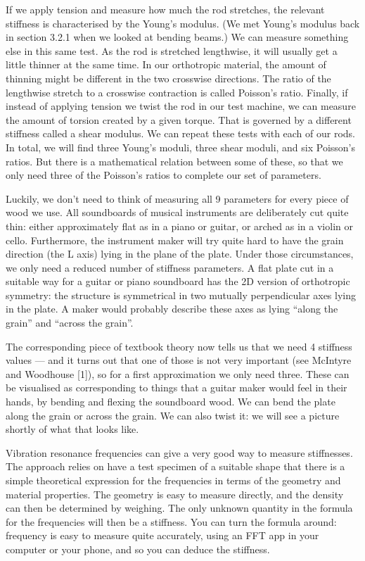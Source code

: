   If we apply tension and measure how much the rod stretches, the relevant 
  stiffness is characterised by the Young’s modulus. (We met Young’s modulus 
  back in section 3.2.1 when we looked at bending beams.) We can measure 
  something else in this same test. As the rod is stretched lengthwise, it will 
  usually get a little thinner at the same time. In our orthotropic material, 
  the amount of thinning might be different in the two crosswise directions. 
  The ratio of the lengthwise stretch to a crosswise contraction is called 
  Poisson’s ratio. Finally, if instead of applying tension we twist the rod in 
  our test machine, we can measure the amount of torsion created by a given 
  torque. That is governed by a different stiffness called a shear modulus. We 
  can repeat these tests with each of our rods. In total, we will find three 
  Young's moduli, three shear moduli, and six Poisson's ratios. But there is a 
  mathematical relation between some of these, so that we only need three of 
  the Poisson's ratios to complete our set of parameters. 

  Luckily, we don’t need to think of measuring all 9 parameters for every piece 
  of wood we use. All soundboards of musical instruments are deliberately cut 
  quite thin: either approximately flat as in a piano or guitar, or arched as 
  in a violin or cello. Furthermore, the instrument maker will try quite hard 
  to have the grain direction (the L axis) lying in the plane of the plate. 
  Under those circumstances, we only need a reduced number of stiffness 
  parameters. A flat plate cut in a suitable way for a guitar or piano 
  soundboard has the 2D version of orthotropic symmetry: the structure is 
  symmetrical in two mutually perpendicular axes lying in the plate. A maker 
  would probably describe these axes as lying “along the grain” and “across the 
  grain”. 

  The corresponding piece of textbook theory now tells us that we need 4 
  stiffness values — and it turns out that one of those is not very important 
  (see McIntyre and Woodhouse [1]), so for a first approximation we only need 
  three. These can be visualised as corresponding to things that a guitar maker 
  would feel in their hands, by bending and flexing the soundboard wood. We can 
  bend the plate along the grain or across the grain. We can also twist it: we 
  will see a picture shortly of what that looks like. 

  Vibration resonance frequencies can give a very good way to measure 
  stiffnesses. The approach relies on have a test specimen of a suitable shape 
  that there is a simple theoretical expression for the frequencies in terms of 
  the geometry and material properties. The geometry is easy to measure 
  directly, and the density can then be determined by weighing. The only 
  unknown quantity in the formula for the frequencies will then be a stiffness. 
  You can turn the formula around: frequency is easy to measure quite 
  accurately, using an FFT app in your computer or your phone, and so you can 
  deduce the stiffness. 

